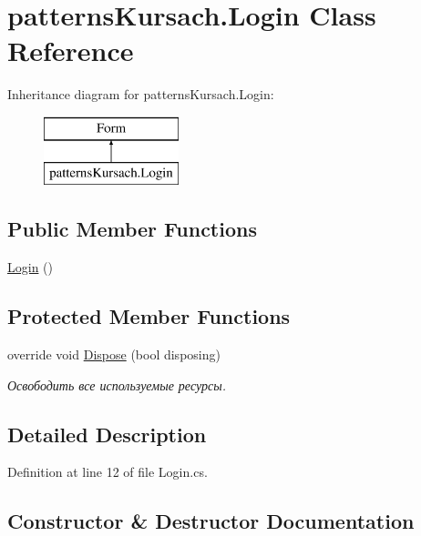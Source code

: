 \hypertarget{classpatterns_kursach_1_1_login}{}\section{patterns\+Kursach.\+Login Class Reference}
\label{classpatterns_kursach_1_1_login}
Inheritance diagram for patterns\+Kursach.\+Login\+:\begin{figure}[H]
\begin{center}
\leavevmode
\includegraphics[height=2.000000cm]{classpatterns_kursach_1_1_login}
\end{center}
\end{figure}
\subsection*{Public Member Functions}
\begin{DoxyCompactItemize}
\item 
\mbox{\hyperlink{classpatterns_kursach_1_1_login_a634b6674a8c0c0ceace74f06683b1e2a}{Login}} ()
\end{DoxyCompactItemize}
\subsection*{Protected Member Functions}
\begin{DoxyCompactItemize}
\item 
override void \mbox{\hyperlink{classpatterns_kursach_1_1_login_ad03dba5cc72d1a588166064d049911db}{Dispose}} (bool disposing)
\begin{DoxyCompactList}\small\item\em Освободить все используемые ресурсы. \end{DoxyCompactList}\end{DoxyCompactItemize}


\subsection{Detailed Description}


Definition at line 12 of file Login.\+cs.



\subsection{Constructor \& Destructor Documentation}
\mbox{\label{classpatterns_kursach_1_1_login_a634b6674a8c0c0ceace74f06683b1e2a}} 
